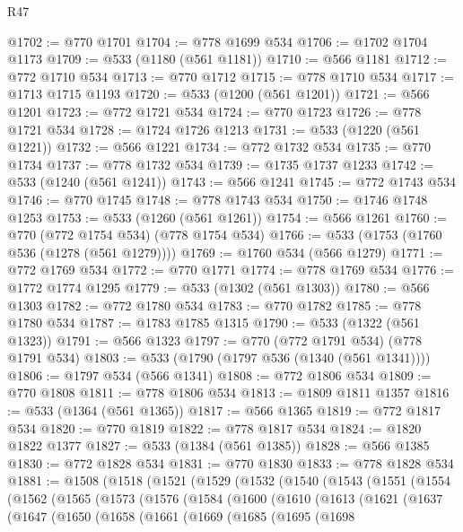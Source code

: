\begin{lexlean}{R47}
\begin{coremodule}
@1702 := @770 @1701
@1704 := @778 @1699 @534
@1706 := @1702 @1704 @1173
@1709 := @533 (@1180 (@561 @1181))
@1710 := @566 @1181
@1712 := @772 @1710 @534
@1713 := @770 @1712
@1715 := @778 @1710 @534
@1717 := @1713 @1715 @1193
@1720 := @533 (@1200 (@561 @1201))
@1721 := @566 @1201
@1723 := @772 @1721 @534
@1724 := @770 @1723
@1726 := @778 @1721 @534
@1728 := @1724 @1726 @1213
@1731 := @533 (@1220 (@561 @1221))
@1732 := @566 @1221
@1734 := @772 @1732 @534
@1735 := @770 @1734
@1737 := @778 @1732 @534
@1739 := @1735 @1737 @1233
@1742 := @533 (@1240 (@561 @1241))
@1743 := @566 @1241
@1745 := @772 @1743 @534
@1746 := @770 @1745
@1748 := @778 @1743 @534
@1750 := @1746 @1748 @1253
@1753 := @533 (@1260 (@561 @1261))
@1754 := @566 @1261
@1760 := @770 (@772 @1754 @534) (@778 @1754 @534)
@1766 := @533 (@1753 (@1760 @536 (@1278 (@561 @1279))))
@1769 := @1760 @534 (@566 @1279)
@1771 := @772 @1769 @534
@1772 := @770 @1771
@1774 := @778 @1769 @534
@1776 := @1772 @1774 @1295
@1779 := @533 (@1302 (@561 @1303))
@1780 := @566 @1303
@1782 := @772 @1780 @534
@1783 := @770 @1782
@1785 := @778 @1780 @534
@1787 := @1783 @1785 @1315
@1790 := @533 (@1322 (@561 @1323))
@1791 := @566 @1323
@1797 := @770 (@772 @1791 @534) (@778 @1791 @534)
@1803 := @533 (@1790 (@1797 @536 (@1340 (@561 @1341))))
@1806 := @1797 @534 (@566 @1341)
@1808 := @772 @1806 @534
@1809 := @770 @1808
@1811 := @778 @1806 @534
@1813 := @1809 @1811 @1357
@1816 := @533 (@1364 (@561 @1365))
@1817 := @566 @1365
@1819 := @772 @1817 @534
@1820 := @770 @1819
@1822 := @778 @1817 @534
@1824 := @1820 @1822 @1377
@1827 := @533 (@1384 (@561 @1385))
@1828 := @566 @1385
@1830 := @772 @1828 @534
@1831 := @770 @1830
@1833 := @778 @1828 @534
@1881 := @1508
    (@1518
      (@1521
        (@1529
          (@1532
            (@1540
              (@1543
                (@1551
                  (@1554
                    (@1562
                      (@1565
                        (@1573
                          (@1576
                            (@1584
                              (@1600
                                (@1610
                                  (@1613
                                    (@1621
                                      (@1637
                                        (@1647
                                          (@1650
                                            (@1658
                                              (@1661
                                                (@1669
                                                  (@1685
                                                    (@1695
                                                      (@1698

\end{coremodule}
\end{lexlean}
